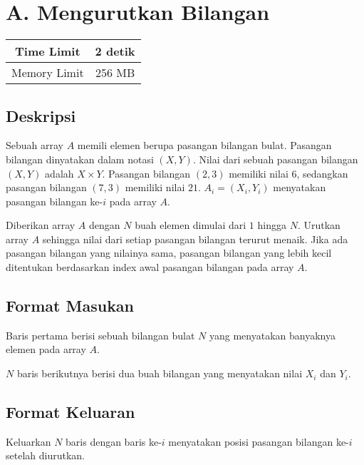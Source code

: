 \documentclass{article}
\begin{document}
\section*{\hfil A. Mengurutkan Bilangan\hfil}

\begin{center}
\begin{tabular}{ |cc| } 
 \hline
 Time Limit & 2 detik \\
 \hline 
 Memory Limit & 256 MB \\
 \hline
\end{tabular}
\end{center}

\subsection*{Deskripsi}

\par\noindent Sebuah array $A$ memili elemen berupa pasangan bilangan bulat. Pasangan bilangan dinyatakan dalam notasi $(X,Y)$. Nilai dari sebuah pasangan bilangan $(X,Y)$ adalah $X \times Y$. Pasangan bilangan $(2,3)$ memiliki nilai $6$, sedangkan pasangan bilangan $(7,3)$ memiliki nilai $21$. $A_i = (X_i, Y_i)$ menyatakan pasangan bilangan ke-$i$ pada array $A$.

\par\noindent Diberikan array $A$ dengan $N$ buah elemen dimulai dari $1$ hingga $N$. Urutkan array $A$ sehingga nilai dari setiap pasangan bilangan terurut menaik. Jika ada pasangan bilangan yang nilainya sama, pasangan bilangan yang lebih kecil ditentukan berdasarkan index awal pasangan bilangan pada array $A$.

\subsection*{Format Masukan}

\par\noindent Baris pertama berisi sebuah bilangan bulat $N$ yang menyatakan banyaknya elemen pada array $A$.
\par\noindent $N$ baris berikutnya berisi dua buah bilangan yang menyatakan nilai $X_i$ dan $Y_i$.

\subsection*{Format Keluaran}

\par\noindent Keluarkan $N$ baris dengan baris ke-$i$ menyatakan posisi pasangan bilangan ke-$i$ setelah diurutkan.
\end{document}
